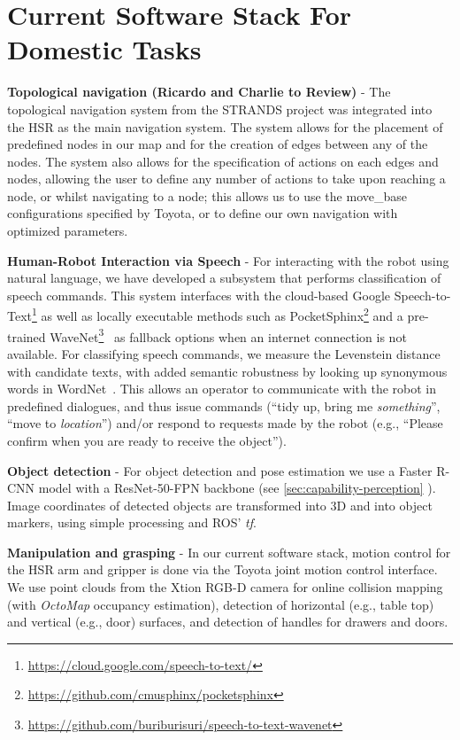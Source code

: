 \documentclass[runningheads,a4paper]{llncs}
\begin{document}
\section{Current Software Stack For Domestic Tasks}\label{sec:current-software-stack-for-domestic-tasks}
\textbf{Topological navigation (Ricardo and Charlie to Review)} - The topological navigation system from the STRANDS project was integrated into the HSR as the main navigation system. The system allows for the placement of predefined nodes in our map and for the creation of edges between any of the nodes. The system also allows for the specification of actions on each edges and nodes, allowing the user to define any number of actions to take upon reaching a node, or whilst navigating to a node; this allows us to use the move\_base configurations specified by Toyota, or to define our own navigation with optimized parameters. 

\textbf{Human-Robot Interaction via Speech} - For interacting with the robot using natural language, we have developed a subsystem that performs classification of speech commands. 
This system interfaces with the cloud-based Google Speech-to-Text\footnote{\url{https://cloud.google.com/speech-to-text/}} as well as locally executable methods such as PocketSphinx\footnote{\url{https://github.com/cmusphinx/pocketsphinx}} and a pre-trained WaveNet\footnote{\url{https://github.com/buriburisuri/speech-to-text-wavenet}}~\cite{oord2016wavenet} as fallback options when an internet connection is not available. 
For classifying speech commands, we measure the Levenstein distance with candidate texts, with added semantic robustness by looking up synonymous words in WordNet~\cite{miller1995wordnet}. 
This allows an operator to communicate with the robot in predefined dialogues, and thus issue commands (``tidy up, bring me \emph{something}'', ``move to \emph{location}'') and/or respond to requests made by the robot (e.g., ``Please confirm when you are ready to receive the object'').

\textbf{Object detection} - For object detection and pose estimation we use a Faster R-CNN model with a ResNet-50-FPN backbone (see \ref{sec:capability-perception} ). Image coordinates of detected objects are transformed into 3D  and into object markers, using simple processing and ROS' \textit{tf}.  

\textbf{Manipulation and grasping} - In our current software stack, motion control for the HSR arm and gripper is done via the Toyota joint motion control interface.
%
We use point clouds from the Xtion RGB-D camera for online collision mapping (with \textit{OctoMap} occupancy estimation), detection of horizontal (e.g., table top) and vertical (e.g., door) surfaces, and detection of handles for drawers and doors.
\end{document}
